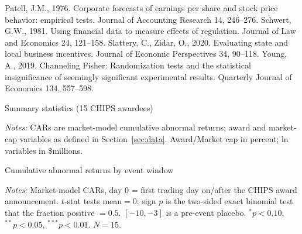 \documentclass[12pt]{article}
\begin{document}
\begin{thebibliography}{99}
 Patell, J.M., 1976.
Corporate forecasts of earnings per share and stock price behavior: empirical tests.
Journal of Accounting Research 14, 246--276.
 Schwert, G.W., 1981.
Using financial data to measure effects of regulation. Journal of Law and Economics 24, 121--158.
Slattery, C., Zidar, O., 2020. Evaluating state and local business incentives. Journal of Economic Perspectives 34, 90--118.
 Young, A., 2019. Channeling Fisher: Randomization tests and the
statistical insignificance of seemingly significant experimental results. Quarterly Journal of
Economics 134, 557--598.
\end{thebibliography}

\FloatBarrier
\newpage
\begin{table}[htbp]\centering
\begin{threeparttable}
\caption{Summary statistics (15 CHIPS awardees)}\label{tab:sumstats}\small

\begin{tablenotes}\small\item \textit{Notes:} CARs are market-model cumulative abnormal
returns; award and market-cap variables as defined in Section~\ref{sec:data}. Award/Market cap in
percent; ln variables in \$millions.
\end{tablenotes}
\end{threeparttable}
\end{table}

\begin{table}[htbp]\centering
\begin{threeparttable}
\caption{Cumulative abnormal returns by event window}\label{tab:cars}\small

\begin{tablenotes}\small\item \textit{Notes:} Market-model CARs, day 0 = first trading day
on/after the CHIPS award announcement. $t$-stat tests mean${}=0$; sign $p$ is the two-sided
exact binomial test that the fraction positive ${}=0.5$. $[-10,-3]$ is a pre-event placebo.
$^{*}p<0.10$, $^{**}p<0.05$, $^{***}p<0.01$. $N=15$.
\end{tablenotes}
\end{threeparttable}
\end{table}
\end{document}
